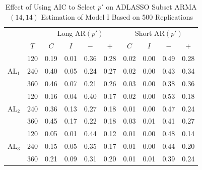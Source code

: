 \begin{table}[htbp]
\caption{Effect of Using AIC to Select $p'$ on ADLASSO Subset ARMA$(14,14)$ Estimation of Model I Based on 500 Replications}
\centering
\begin{tabular}{cc|cccc|cccc}
  \hline
  & & \multicolumn{4}{c|}{Long AR$(p')$} & \multicolumn{4}{c}{Short AR$(p')$} \\
  \cline{4-5}  \cline{8-9}
  & $T$ & $C$ & $I$ & $-$ & $+$ & $C$ & $I$ & $-$ & $+$\\
  \hline
  \multirow{3}{*}{$\textrm{AL}_1$} & 120 & 0.19 & 0.01 & 0.36 & 0.28 & 0.02 & 0.00 & 0.49 & 0.28 \\ 
  & 240 & 0.40 & 0.05 & 0.24 & 0.27 & 0.02 & 0.00 & 0.43 & 0.34 \\ 
  & 360 & 0.46 & 0.07 & 0.21 & 0.26 & 0.03 & 0.00 & 0.38 & 0.36 \\ 
  \hline
  \multirow{3}{*}{$\textrm{AL}_2$} & 120 & 0.16 & 0.04 & 0.40 & 0.17 & 0.02 & 0.00 & 0.53 & 0.18 \\ 
  & 240 & 0.36 & 0.13 & 0.27 & 0.18 & 0.01 & 0.00 & 0.47 & 0.24 \\ 
  & 360 & 0.45 & 0.17 & 0.22 & 0.18 & 0.03 & 0.01 & 0.41 & 0.27 \\ 
  \hline
  \multirow{3}{*}{$\textrm{AL}_3$} & 120 & 0.05 & 0.01 & 0.44 & 0.12 & 0.01 & 0.00 & 0.48 & 0.14 \\ 
  & 240 & 0.15 & 0.05 & 0.35 & 0.17 & 0.01 & 0.00 & 0.44 & 0.20 \\ 
  & 360 & 0.21 & 0.09 & 0.31 & 0.20 & 0.01 & 0.01 & 0.39 & 0.24 \\ 
   \hline
\end{tabular}
\label{tab:longvsshort1}
\end{table}

